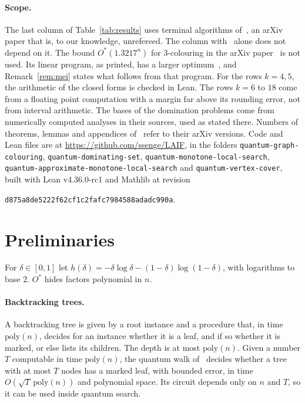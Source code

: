 \documentclass[11pt]{article}
\theoremstyle{remark}
\newcommand{\poly}{\mathrm{poly}}
\begin{document}
\paragraph{Scope.} The last column of Table~\ref{tab:results} uses terminal algorithms of~\cite{YS26}, an arXiv paper that is, to our knowledge, unrefereed. The column with~\cite{WGJ24} alone does not depend on it. The bound $O^*(1.3217^n)$ for 3-colouring in the arXiv paper~\cite{Mei23} is not used. Its linear program, as printed, has a larger optimum~\cite[Appendix~F]{YS26}, and Remark~\ref{rem:mei} states what follows from that program. For the rows $k = 4, 5$, the arithmetic of the closed forms is checked in Lean. The rows $k = 6$ to $18$ come from a floating point computation with a margin far above its rounding error, not from interval arithmetic. The bases of the domination problems come from numerically computed analyses in their sources, used as stated there. Numbers of theorems, lemmas and appendices of~\cite{SM22,YS26} refer to their arXiv versions. Code and Lean files are at \url{https://github.com/ssenge/LAIF}, in the folders \texttt{quantum-graph-colouring}, \texttt{quantum-dominating-set}, \texttt{quantum-monotone-local-search}, \texttt{quantum-approximate-monotone-local-search} and \texttt{quantum-vertex-cover}, built with Lean v4.36.0-rc1 and Mathlib at revision {\sloppy\texttt{d875a8de5222f62cf1c2fafc7984588adadc990a}.\par}

\section{Preliminaries}

For $\delta \in [0,1]$ let $h(\delta) = -\delta\log\delta - (1-\delta)\log(1-\delta)$, with logarithms to base 2. $O^*$ hides factors polynomial in $n$.

\paragraph{Backtracking trees.} A backtracking tree is given by a root instance and a procedure that, in time $\poly(n)$, decides for an instance whether it is a leaf, and if so whether it is marked, or else lists its children. The depth is at most $\poly(n)$. Given a number $T$ computable in time $\poly(n)$, the quantum walk of~\cite{Mon18} decides whether a tree with at most $T$ nodes has a marked leaf, with bounded error, in time $O(\sqrt{T}\,\poly(n))$ and polynomial space. Its circuit depends only on $n$ and $T$, so it can be used inside quantum search.
\end{document}
